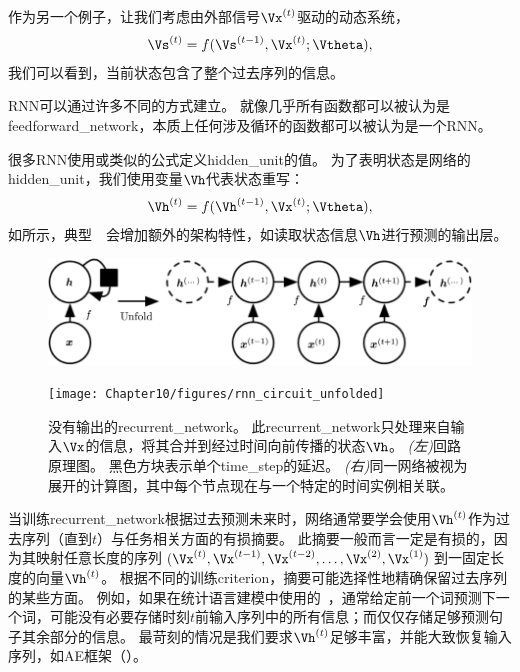 
作为另一个例子，让我们考虑由外部信号$\Vx^{(t)}$驱动的动态系统，
\begin{align}
 \label{eq:104s}
 \Vs^{(t)} = f(\Vs^{(t-1)}, \Vx^{(t)} ; \Vtheta),
\end{align}
我们可以看到，当前状态包含了整个过去序列的信息。

\gls{RNN}可以通过许多不同的方式建立。
就像几乎所有函数都可以被认为是\gls{feedforward_network}，本质上任何涉及循环的函数都可以被认为是一个\gls{RNN}。

很多\gls{RNN}使用或类似的公式定义\gls{hidden_unit}的值。
为了表明状态是网络的\gls{hidden_unit}，我们使用变量$\Vh$代表状态重写：
\begin{align}
 \label{eq:105h}
 \Vh^{(t)} = f(\Vh^{(t-1)}, \Vx^{(t)} ; \Vtheta),
\end{align}
如所示，典型~~会增加额外的架构特性，如读取状态信息$\Vh$进行预测的输出层。
\begin{figure}[!htb]
\ifOpenSource
\centerline{\includegraphics[scale=0.4]{images/90.png}}
\else
\centerline{\texttt{[image: Chapter10/figures/rnn\_circuit\_unfolded]}}
\fi
\caption{没有输出的\gls{recurrent_network}。
此\gls{recurrent_network}只处理来自输入$\Vx$的信息，将其合并到经过时间向前传播的状态$\Vh$。
\emph{(左)}回路原理图。 黑色方块表示单个\gls{time_step}的延迟。
\emph{(右)}同一网络被视为展开的计算图，其中每个节点现在与一个特定的时间实例相关联。
}
\label{fig:chap10_rnn_circuit_unfolded}
\end{figure}

当训练\gls{recurrent_network}根据过去预测未来时，网络通常要学会使用$\Vh^{(t)}$作为过去序列（直到$t$）与任务相关方面的有损摘要。
此摘要一般而言一定是有损的，因为其映射任意长度的序列$(\Vx^{(t)},\Vx^{(t-1)}, \Vx^{(t-2)},\dots,\Vx^{(2)}, \Vx^{(1)})$到一固定长度的向量$\Vh^{(t)}$。
根据不同的训练\gls{criterion}，摘要可能选择性地精确保留过去序列的某些方面。
例如，如果在统计语言建模中使用的~，通常给定前一个词预测下一个词，可能没有必要存储时刻$t$前输入序列中的所有信息；而仅仅存储足够预测句子其余部分的信息。
最苛刻的情况是我们要求$\Vh^{(t)}$足够丰富，并能大致恢复输入序列，如\gls{AE}框架（）。

